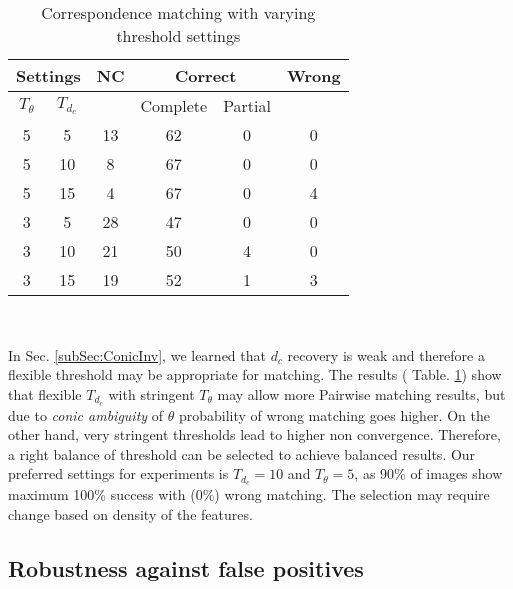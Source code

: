 \documentclass{bmvc2k}
\begin{document}
\begin{table}
\centering
\caption{Correspondence matching with varying threshold settings } \label{table:ThresholdEffect}
\begin{tabular}{ | c | c | c | c | c | c |}
\hline
\multicolumn{2}{|c|}{Settings} & NC & \multicolumn{2}{|c|}{Correct} & Wrong \\ \hline
$ T_\theta $ & $ T_{d_c} $ & {} & Complete & Partial & {}\\ \hline
5 & 5  & 13 & 62 & 0 & 0 \\
5 & 10 & 8 & 67 & 0 & 0 \\
5 & 15 & 4 & 67 & 0 & 4 \\ \hline
3 & 5  & 28 & 47 & 0 & 0 \\
3 & 10 & 21 & 50 & 4 & 0 \\
3 & 15 & 19 & 52 & 1 & 3 \\ \hline
\end{tabular} \\
\label{tab:Exp2}
\end{table}
In Sec. \ref{subSec:ConicInv}, we learned that $ d_c $ recovery is weak and therefore a flexible threshold may be appropriate for matching. The results ( Table. \ref{tab:Exp2}) show that flexible $ T_{d_c} $ with stringent $ T_\theta $ may allow more Pairwise matching results, but due to \textit{conic ambiguity} of $ \theta $ probability of wrong matching goes higher. 
On the other hand, very stringent thresholds lead to higher non convergence. Therefore, a right balance of threshold can be selected to achieve balanced results. Our preferred settings for experiments is $ T_{d_c} = 10 $ and $ T_\theta = 5 $, as 90\% of images show maximum 100\% success with (0\%) wrong matching. The selection may require change based on density of the features. 

\subsection{Robustness against false positives}

\end{document}
